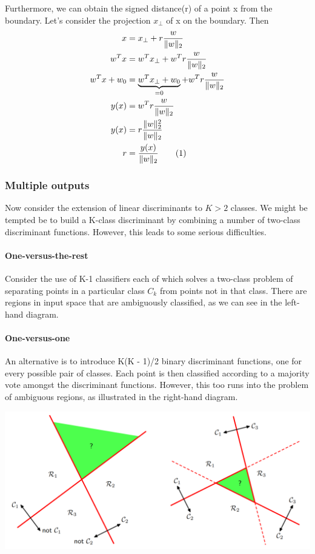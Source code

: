 \documentclass[main.tex]{subfiles}
\newcommand\numberthis{\addtocounter{equation}{1}\tag{\theequation}}
\begin{document}
Furthermore, we can obtain the signed distance(r) of a point x from the boundary. Let's consider the projection $x_{\perp}$ of x on the boundary. Then
\begin{align*}
    x          & = x_{\perp} + r\frac{w}{\| w \|_2}                                 \\
    w^Tx       & = w^T x_{\perp} + w^T r\frac{w}{\| w \|_2}                         \\
    w^Tx + w_0 & = \underbrace{w^T x_{\perp} + w_0}_{=0} + w^T r\frac{w}{\| w \|_2} \\
    y(x)       & = w^T r\frac{w}{\| w \|_2}                                         \\
    y(x)       & = r\frac{\| w \|_2^2}{\| w \|_2}                                   \\
    r          & = \frac{y(x)}{\| w \|_2} \numberthis
\end{align*}

\subsubsection{Multiple outputs}
Now consider the extension of linear discriminants to $K>2$ classes. We might be tempted be to build a K-class discriminant by combining a number of two-class discriminant functions. However, this leads to some serious difficulties.
\paragraph{One-versus-the-rest}
Consider the use of K-1 classifiers each of which solves a two-class problem of separating points in a particular class $C_k$ from points not in that class. There are regions in input space that are ambiguously classified, as we can see in the left-hand diagram.
\paragraph{One-versus-one}
An alternative is to introduce K(K - 1)/2 binary discriminant functions, one for every possible pair of classes. Each
point is then classified according to a majority vote amongst the discriminant functions. However, this too runs into the problem of ambiguous regions, as illustrated in the right-hand diagram.
\begin{center}
    \includegraphics[scale=0.5]{img/Multiclass_classification.PNG}
\end{center}
\end{document}
